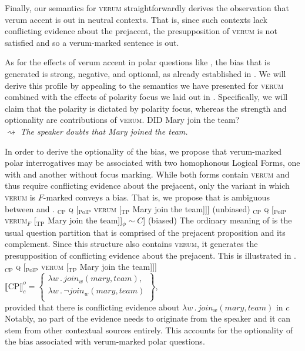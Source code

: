 \documentclass[output=paper,colorlinks,citecolor=brown]{langscibook}
\begin{document}
Finally, our semantics for \textsc{verum} straightforwardly derives the observation that verum accent is out in neutral contexts. That is, since such contexts lack conflicting evidence about the prejacent, the presupposition of \textsc{verum} is not satisfied and so a verum-marked sentence is out. 

As for the effects of verum accent in polar questions like , the bias that is generated is strong, negative, and optional, as already established in . We will derive this profile by appealing to the semantics we have presented for \textsc{verum} combined with the effects of polarity focus we laid out in . Specifically, we will claim that the polarity is dictated by polarity focus, whereas the strength and optionality are contributions of \textsc{verum}.
\is{}
\ea DID Mary join the team?\label{Vrm.Q.Opt} \\
	$\rightsquigarrow$ \textit{The speaker doubts that Mary joined the team.}
\z
\il{}
	
In order to derive the optionality of the bias, we propose that verum-marked polar interrogatives may be associated with two homophonous Logical Forms, one with and another without focus marking. While both forms contain \textsc{verum} and thus require conflicting evidence about the prejacent, only the variant in which \textsc{verum} is $F$-marked conveys a bias. That is, we propose that  is ambiguous between  and .
\is{}
\ea 
	\ea {[}$_{\text{CP}}$ \textsc{q} [$_{\text{PolP}}$ \textsc{verum} [$_{\text{TP}}$ Mary join the team{]]]} \hfill (unbiased)\label{Vrm.LF1}
	\ex {[}$_{\text{CP}}$ \textsc{q} [$_{\text{PolP}}$ \textsc{verum}$_F$ [$_{\text{TP}}$ Mary join the team]]$_{\phi} \sim C$] \hfill (biased)\label{Vrm.LF2}
	\z
\z
\il{}
The ordinary meaning of  is the usual question partition that is comprised of the prejacent proposition and its complement. Since this structure also contains \textsc{verum}, it generates the presupposition of conflicting evidence about the prejacent. This is illustrated in .
\is{}
\ea \label{Vrm.LF1.Der}
	\ea {[}$_{\text{CP}}$ \textsc{q} [$_{\text{PolP}}$ \textsc{verum} [$_{\text{TP}}$ Mary join the team{]]]}
	\ex $\llbracket \text{CP} \rrbracket^{o}_c = \left\{ \begin{array}{l}
		\lambda w \, . \, join_w(mary,team), \\ 
		\lambda w \, . \,\neg join_w(mary,team) \\ 
	\end{array} \right\}$, \\ 
	provided that there is conflicting evidence about $\lambda w \, . \, join_w(mary,team)$ in $c$
	\z
\z
\il{}
Notably, no part of the evidence needs to originate from the speaker and it can stem from other contextual sources entirely. This accounts for the optionality of the bias associated with verum-marked polar questions.
	
\end{document}
